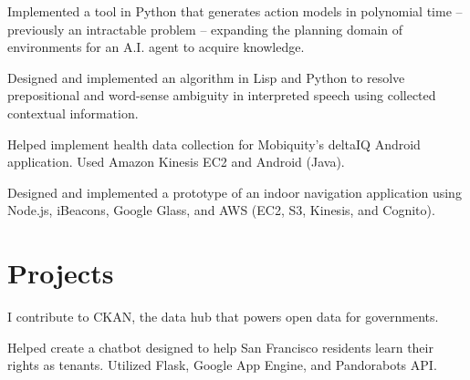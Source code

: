 \documentclass[]{deedy-resume-openfont}
\begin{document}
\begin{minipage}[t]{0.66\textwidth}
\begin{tightemize}
\item Implemented a tool in Python that generates action models in polynomial time -- previously an intractable problem -- expanding the planning domain of environments for an A.I. agent to acquire knowledge.

\item Designed and implemented an algorithm in Lisp and Python to resolve prepositional and word-sense ambiguity in interpreted speech using collected contextual information.
\end{tightemize}
\sectionsep

\begin{tightemize}
\item Helped implement health data collection for Mobiquity’s deltaIQ Android application. Used Amazon Kinesis EC2 and Android (Java).

\item Designed and implemented a prototype of an indoor navigation application using Node.js, iBeacons, Google Glass, and AWS (EC2, S3, Kinesis, and Cognito).
\end{tightemize}


\section{Projects}

\begin{tightemize}
\item I contribute to CKAN, the data hub that powers open data for governments.
\end{tightemize}
\sectionsep

\begin{tightemize}
\item Helped create a chatbot designed to help San Francisco residents learn their rights as tenants. Utilized Flask, Google App Engine, and Pandorabots API.
\end{tightemize}
\sectionsep


\end{minipage}
\end{document}
